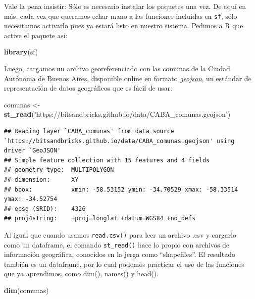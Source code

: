 \documentclass[spanish,]{book}
\newenvironment{Shaded}{\begin{snugshade}}{\end{snugshade}}
\newcommand{\KeywordTok}[1]{\textcolor[rgb]{0.13,0.29,0.53}{\textbf{#1}}}
\newcommand{\NormalTok}[1]{#1}
\newcommand{\StringTok}[1]{\textcolor[rgb]{0.31,0.60,0.02}{#1}}
\begin{document}
Vale la pena insistir: Sólo es necesario instalar los paquetes una vez. De aquí en más, cada vez que queramos echar mano a las funciones incluidas en \texttt{sf}, sólo necesitamos activarlo pues ya estará listo en nuestro sistema. Pedimos a R que active el paquete así:

\begin{Shaded}
\begin{Highlighting}[]
\KeywordTok{library}\NormalTok{(sf)}
\end{Highlighting}
\end{Shaded}

Luego, cargamos un archivo georeferenciado con las comunas de la Ciudad Autónoma de Buenos Aires, disponible online en formato \href{https://es.wikipedia.org/wiki/GeoJSON}{\emph{geojson}}, un estándar de representación de datos geográficos que es fácil de usar:

\begin{Shaded}
\begin{Highlighting}[]
\NormalTok{comunas <-}\StringTok{ }\KeywordTok{st_read}\NormalTok{(}\StringTok{'https://bitsandbricks.github.io/data/CABA_comunas.geojson'}\NormalTok{)}
\end{Highlighting}
\end{Shaded}

\begin{verbatim}
## Reading layer `CABA_comunas' from data source `https://bitsandbricks.github.io/data/CABA_comunas.geojson' using driver `GeoJSON'
## Simple feature collection with 15 features and 4 fields
## geometry type:  MULTIPOLYGON
## dimension:      XY
## bbox:           xmin: -58.53152 ymin: -34.70529 xmax: -58.33514 ymax: -34.52754
## epsg (SRID):    4326
## proj4string:    +proj=longlat +datum=WGS84 +no_defs
\end{verbatim}

Al igual que cuando usamos \texttt{read.csv()} para leer un archivo .csv y cargarlo como un dataframe, el comando \texttt{st\_read()} hace lo propio con archivos de información geográfica, conocidos en la jerga como ``shapefiles''. El resultado también es un dataframe, por lo cual podemos practicar el uso de las funciones que ya aprendimos, como dim(), names() y head().

\begin{Shaded}
\begin{Highlighting}[]
\KeywordTok{dim}\NormalTok{(comunas)}
\end{Highlighting}
\end{Shaded}
\end{document}
